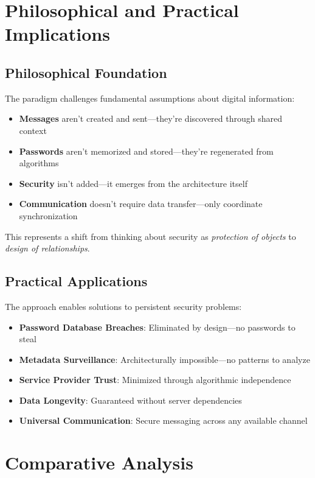 \documentclass[11pt,a4paper]{article}
\begin{document}
\section{Philosophical and Practical Implications}

\subsection{Philosophical Foundation}

The paradigm challenges fundamental assumptions about digital information:

\begin{itemize}
    \item \textbf{Messages} aren't created and sent—they're discovered through shared context
    \item \textbf{Passwords} aren't memorized and stored—they're regenerated from algorithms
    \item \textbf{Security} isn't added—it emerges from the architecture itself
    \item \textbf{Communication} doesn't require data transfer—only coordinate synchronization
\end{itemize}

This represents a shift from thinking about security as \emph{protection of objects} to \emph{design of relationships}.

\subsection{Practical Applications}

The approach enables solutions to persistent security problems:

\begin{itemize}
\item \textbf{Password Database Breaches}: Eliminated by design—no passwords to steal
\item \textbf{Metadata Surveillance}: Architecturally impossible—no patterns to analyze
\item \textbf{Service Provider Trust}: Minimized through algorithmic independence
\item \textbf{Data Longevity}: Guaranteed without server dependencies
\item \textbf{Universal Communication}: Secure messaging across any available channel
\end{itemize}

\section{Comparative Analysis}
\end{document}
